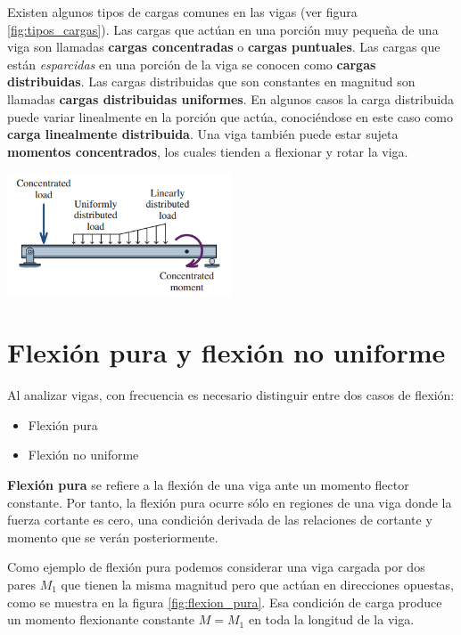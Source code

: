 \documentclass[12pt,letterpaper]{article}
\begin{document}
Existen algunos tipos de cargas comunes en las vigas (ver figura \ref{fig:tipos_cargas}). Las cargas que actúan en una porción 
muy pequeña de una viga son llamadas \textbf{cargas concentradas} o \textbf{cargas puntuales}. 
Las cargas que están \textit{esparcidas} en una porción de la viga se conocen como \textbf{cargas distribuidas}. Las 
cargas distribuidas que son constantes en magnitud son llamadas \textbf{cargas distribuidas uniformes}. En algunos casos 
la carga distribuida puede variar linealmente en la porción que actúa, conociéndose en este caso como \textbf{carga linealmente distribuida}. 
Una viga también puede estar sujeta \textbf{momentos concentrados}, los cuales tienden a flexionar y rotar la viga.

\begin{center}
\includegraphics[width=0.5\textwidth]{img/tipos_cargas.PNG}
\label{fig:tipos_cargas}
\end{center}



\section{Flexión pura y flexión no uniforme}

Al analizar vigas, con frecuencia es necesario distinguir entre dos casos de flexión:

\begin{itemize}
\item Flexión pura 
\item Flexión no uniforme
\end{itemize}

\textbf{Flexión pura} se refiere a la flexión de una viga ante 
un momento flector constante. Por tanto, la flexión pura ocurre sólo en
regiones de una viga donde la fuerza cortante es cero, una condición derivada 
de las relaciones de cortante y momento que se verán posteriormente. 

Como ejemplo de flexión pura podemos considerar una viga cargada por dos pares $M_1$ que tienen la misma 
magnitud pero que actúan en direcciones opuestas, como se muestra en la figura \ref{fig:flexion_pura}. 
Esa condición de carga produce un momento flexionante constante $M=M_1$ en toda la longitud de la viga.
\end{document}
